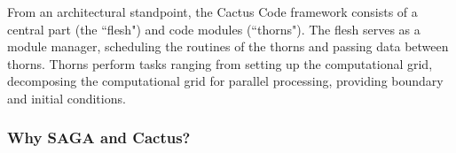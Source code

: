 \documentclass[conference,final]{IEEEtran}
\begin{document}
From an architectural standpoint, the Cactus Code framework consists
of a central part (the ``flesh") and code modules (``thorns").  The
flesh serves as a module manager, scheduling the routines of the
thorns and passing data between thorns.  Thorns perform tasks ranging
from setting up the computational grid, decomposing the computational
grid for parallel processing, providing boundary and initial
conditions.
%



\subsubsection{Why SAGA and Cactus?} 
\end{document}
